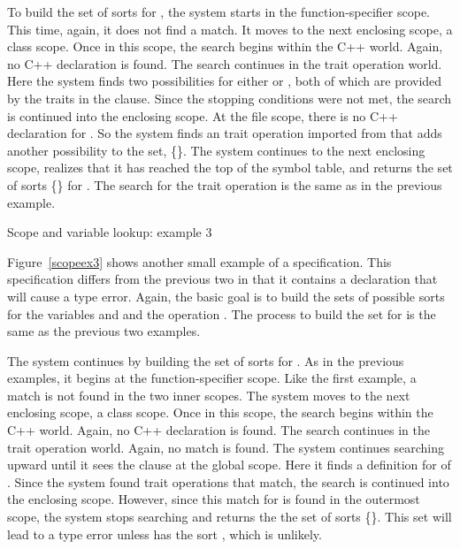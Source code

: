 To build the set of sorts for
, the system starts in the function-specifier scope. This
time, again, it does not find a match. It moves to the next
enclosing scope, a class scope. Once in this scope, the search begins
within the C++ world. Again, no C++ declaration is found. The
search continues in the trait operation world. Here the system
finds two possibilities for  either  or , both of which are provided by the traits in the 
clause. Since the stopping conditions were not met, the search
is continued into the enclosing scope. At the file scope, there is no
C++ declaration for . So the system finds an trait
operation imported from  that adds another
possibility to the set, \{\}. The system continues to
the next enclosing scope, realizes that it has reached the top of the
symbol table, and returns the set of sorts
\{\} for . The search for the trait operation \reserved{+} is the same as in the
previous example.


\begin{BFIGURE}
\begin{center}

\end{center}
\caption{Scope and variable lookup: example 3}
\label{scopeex3}
\end{BFIGURE}

Figure~\ref{scopeex3} shows another small example of a
specification. This specification differs from the previous two in
that it contains a declaration that will cause a type error. Again,
the basic goal is to build the sets of possible sorts for the
variables
 and  and the operation \reserved{+}. The
process to build the set for  is the same as
the previous two examples.

The system continues by building the set of sorts for
. As in the previous examples, it begins at the
function-specifier scope. Like the first example, a match is not
found in the two inner scopes. The system moves to the next enclosing
scope, a class scope. Once in this scope, the search begins within the
C++ world. Again, no C++ declaration is found. The search continues in
the trait operation world. Again, no match is found. The system
continues searching upward until it sees the  clause at
the global scope. Here it finds a definition for  of
.  Since the system found trait operations that
match, the search is continued into the enclosing scope. However,
since this match for  is found in the outermost scope, the
system stops searching and returns the the set of sorts
\{\}. This set will lead to a type error unless \reserved{+}
has the sort , which is unlikely. 

